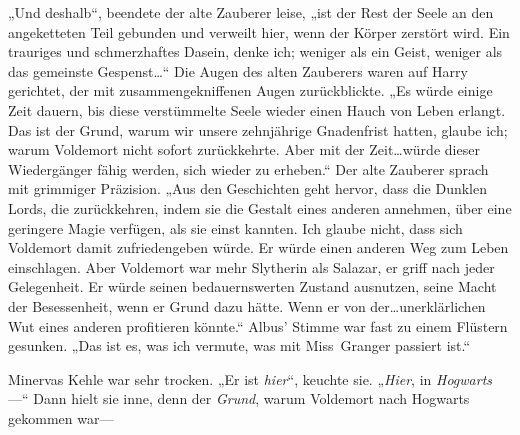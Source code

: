 „Und deshalb“, beendete der alte Zauberer leise, „ist der Rest der Seele an den angeketteten Teil gebunden und verweilt hier, wenn der Körper zerstört wird. Ein trauriges und schmerzhaftes Dasein, denke ich; weniger als ein Geist, weniger als das gemeinste Gespenst…“
Die Augen des alten Zauberers waren auf Harry gerichtet, der mit zusammengekniffenen Augen zurückblickte.
„Es würde einige Zeit dauern, bis diese verstümmelte Seele wieder einen Hauch von Leben erlangt. Das ist der Grund, warum wir unsere zehnjährige Gnadenfrist hatten, glaube ich; warum Voldemort nicht sofort zurückkehrte. Aber mit der Zeit…würde dieser Wiedergänger fähig werden, sich wieder zu erheben.“
Der alte Zauberer sprach mit grimmiger Präzision.
„Aus den Geschichten geht hervor, dass die Dunklen Lords, die zurückkehren, indem sie die Gestalt eines anderen annehmen, über eine geringere Magie verfügen, als sie einst kannten. Ich glaube nicht, dass sich Voldemort damit zufriedengeben würde. Er würde einen anderen Weg zum Leben einschlagen. Aber Voldemort war mehr Slytherin als Salazar, er griff nach jeder Gelegenheit. Er würde seinen bedauernswerten Zustand ausnutzen, seine Macht der Besessenheit, wenn er Grund dazu hätte. Wenn er von der…unerklärlichen Wut eines anderen profitieren könnte.“ Albus’ Stimme war fast zu einem Flüstern gesunken.
„Das ist es, was ich vermute, was mit Miss~Granger passiert ist.“

%
Minervas Kehle war sehr trocken. „Er ist \emph{hier}“, keuchte sie. „\emph{Hier}, in \emph{Hogwarts}—“ Dann hielt sie inne, denn der \emph{Grund}, warum Voldemort nach Hogwarts gekommen war—

